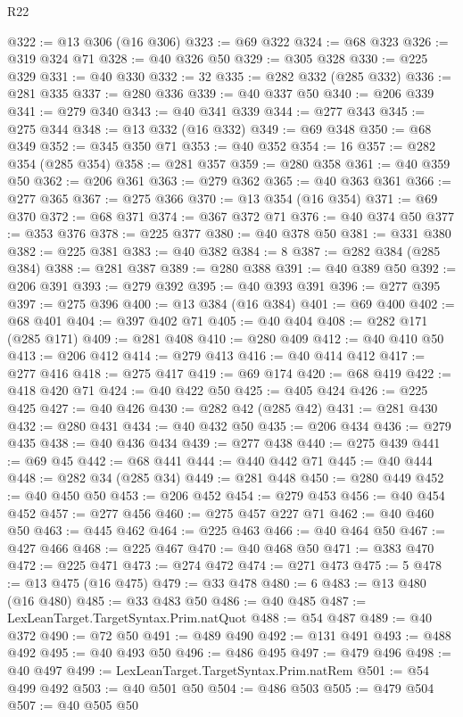 \begin{lexlean}{R22}
\begin{coremodule}
@322 := @13 @306 (@16 @306)
@323 := @69 @322
@324 := @68 @323
@326 := @319 @324 @71
@328 := @40 @326 @50
@329 := @305 @328
@330 := @225 @329
@331 := @40 @330
@332 := 32
@335 := @282 @332 (@285 @332)
@336 := @281 @335
@337 := @280 @336
@339 := @40 @337 @50
@340 := @206 @339
@341 := @279 @340
@343 := @40 @341 @339
@344 := @277 @343
@345 := @275 @344
@348 := @13 @332 (@16 @332)
@349 := @69 @348
@350 := @68 @349
@352 := @345 @350 @71
@353 := @40 @352
@354 := 16
@357 := @282 @354 (@285 @354)
@358 := @281 @357
@359 := @280 @358
@361 := @40 @359 @50
@362 := @206 @361
@363 := @279 @362
@365 := @40 @363 @361
@366 := @277 @365
@367 := @275 @366
@370 := @13 @354 (@16 @354)
@371 := @69 @370
@372 := @68 @371
@374 := @367 @372 @71
@376 := @40 @374 @50
@377 := @353 @376
@378 := @225 @377
@380 := @40 @378 @50
@381 := @331 @380
@382 := @225 @381
@383 := @40 @382
@384 := 8
@387 := @282 @384 (@285 @384)
@388 := @281 @387
@389 := @280 @388
@391 := @40 @389 @50
@392 := @206 @391
@393 := @279 @392
@395 := @40 @393 @391
@396 := @277 @395
@397 := @275 @396
@400 := @13 @384 (@16 @384)
@401 := @69 @400
@402 := @68 @401
@404 := @397 @402 @71
@405 := @40 @404
@408 := @282 @171 (@285 @171)
@409 := @281 @408
@410 := @280 @409
@412 := @40 @410 @50
@413 := @206 @412
@414 := @279 @413
@416 := @40 @414 @412
@417 := @277 @416
@418 := @275 @417
@419 := @69 @174
@420 := @68 @419
@422 := @418 @420 @71
@424 := @40 @422 @50
@425 := @405 @424
@426 := @225 @425
@427 := @40 @426
@430 := @282 @42 (@285 @42)
@431 := @281 @430
@432 := @280 @431
@434 := @40 @432 @50
@435 := @206 @434
@436 := @279 @435
@438 := @40 @436 @434
@439 := @277 @438
@440 := @275 @439
@441 := @69 @45
@442 := @68 @441
@444 := @440 @442 @71
@445 := @40 @444
@448 := @282 @34 (@285 @34)
@449 := @281 @448
@450 := @280 @449
@452 := @40 @450 @50
@453 := @206 @452
@454 := @279 @453
@456 := @40 @454 @452
@457 := @277 @456
@460 := @275 @457 @227 @71
@462 := @40 @460 @50
@463 := @445 @462
@464 := @225 @463
@466 := @40 @464 @50
@467 := @427 @466
@468 := @225 @467
@470 := @40 @468 @50
@471 := @383 @470
@472 := @225 @471
@473 := @274 @472
@474 := @271 @473
@475 := 5
@478 := @13 @475 (@16 @475)
@479 := @33 @478
@480 := 6
@483 := @13 @480 (@16 @480)
@485 := @33 @483 @50
@486 := @40 @485
@487 := LexLeanTarget.TargetSyntax.Prim.natQuot
@488 := @54 @487
@489 := @40 @372
@490 := @72 @50
@491 := @489 @490
@492 := @131 @491
@493 := @488 @492
@495 := @40 @493 @50
@496 := @486 @495
@497 := @479 @496
@498 := @40 @497
@499 := LexLeanTarget.TargetSyntax.Prim.natRem
@501 := @54 @499 @492
@503 := @40 @501 @50
@504 := @486 @503
@505 := @479 @504
@507 := @40 @505 @50

\end{coremodule}
\end{lexlean}
